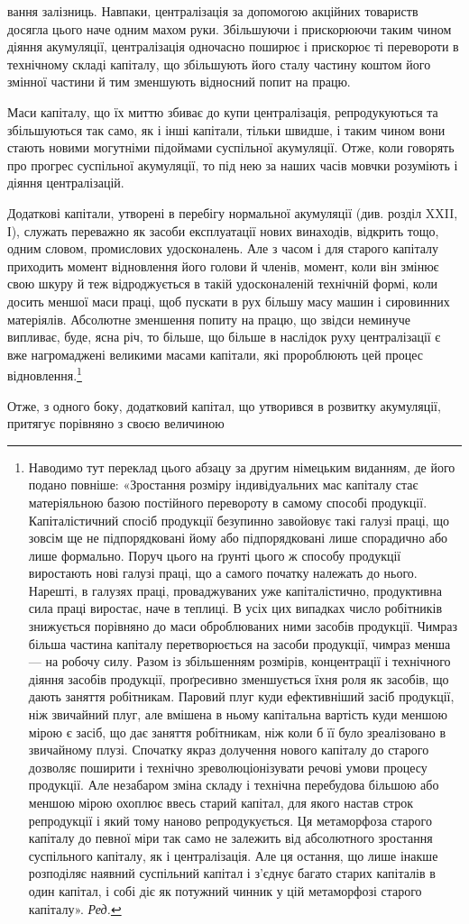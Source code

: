 вання залізниць. Навпаки, централізація за допомогою акційних
товариств досягла цього наче одним махом руки. Збільшуючи
і прискорюючи таким чином діяння акумуляції, централізація
одночасно поширює і прискорює ті перевороти в технічному
складі капіталу, що збільшують його сталу частину коштом його
змінної частини й тим зменшують відносний попит на працю.

Маси капіталу, що їх миттю збиває до купи централізація,
репродукуються та збільшуються так само, як і інші капітали,
тільки швидше, і таким чином вони стають новими могутніми
підоймами суспільної акумуляції. Отже, коли говорять про прогрес
суспільної акумуляції, то під нею за наших часів мовчки
розуміють і діяння централізацій.

Додаткові капітали, утворені в перебігу нормальної акумуляції
(див. розділ XXII, І), служать переважно як засоби
експлуатації нових винаходів, відкрить тощо, одним словом,
промислових удосконалень. Але з часом і для старого капіталу
приходить момент відновлення його голови й членів, момент,
коли він змінює свою шкуру й теж відроджується в такій удосконаленій
технічній формі, коли досить меншої маси праці,
щоб пускати в рух більшу масу машин і сировинних матеріялів.
Абсолютне зменшення попиту на працю, що звідси неминуче
випливає, буде, ясна річ, то більше, що більше в наслідок руху
централізації є вже нагромаджені великими масами капітали,
які пророблюють цей процес відновлення.\footnote*{
Наводимо тут переклад цього абзацу за другим німецьким виданням,
де його подано повніше: «Зростання розміру індивідуальних мас
капіталу стає матеріяльною базою постійного перевороту в самому способі
продукції. Капіталістичний спосіб продукції безупинно завойовує
такі галузі праці, що зовсім ще не підпорядковані йому або підпорядковані
лише спорадично або лише формально. Поруч цього на ґрунті
цього ж способу продукції виростають нові галузі праці, що а самого початку
належать до нього. Нарешті, в галузях праці, проваджуваних
уже капіталістично, продуктивна сила праці виростає, наче в теплиці.
В усіх цих випадках число робітників знижується порівняно до маси
оброблюваних ними засобів продукції. Чимраз більша частина капіталу
перетворюється на засоби продукції, чимраз менша — на робочу силу.
Разом із збільшенням розмірів, концентрації і технічного діяння
засобів продукції, проґресивно зменшується їхня роля як засобів, що
дають заняття робітникам. Паровий плуг куди ефективніший засіб продукції,
ніж звичайний плуг, але вмішена в ньому капітальна вартість
куди меншою мірою є засіб, що дає заняття робітникам, ніж коли б її
було зреалізовано в звичайному плузі. Спочатку якраз долучення нового
капіталу до старого дозволяє поширити і технічно зреволюціонізувати
речові умови процесу продукції. Але незабаром зміна складу і технічна
перебудова більшою або меншою мірою охоплює ввесь старий капітал,
для якого настав строк репродукції і який тому наново репродукується.
Ця метаморфоза старого капіталу до певної міри так само не залежить від
абсолютного зростання суспільного капіталу, як і централізація. Але ця
остання, що лише інакше розподіляє наявний суспільний капітал і з’єднує
багато старих капіталів в один капітал, і собі діє як потужний чинник
у цій метаморфозі старого капіталу». \emph{Ред.}
}

Отже, з одного боку, додатковий капітал, що утворився в
розвитку акумуляції, притягує порівняно з своєю величиною